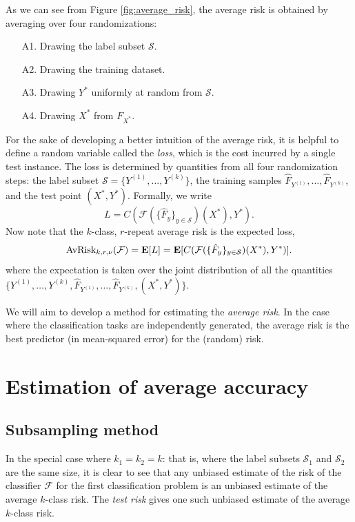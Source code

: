 As we can see from Figure \ref{fig:average_risk}, the average risk is obtained by averaging
over four randomizations:
\begin{enumerate}
\item[A1.] Drawing the label subset $\mathcal{S}$.
\item[A2.] Drawing the training dataset.
\item[A3.] Drawing $Y^*$ uniformly at random from $\mathcal{S}$.
\item[A4.] Drawing $X^*$ from $F_{X^*}$.
\end{enumerate}

For the sake of developing a better intuition of the average risk, it
is helpful to define a random variable called the \emph{loss}, which
is the cost incurred by a single test instance.  The loss is
determined by quantities from all four randomization steps: the label
subset $\mathcal{S} = \{Y^{(1)},\hdots, Y^{(k)}\}$, the training samples
$\hat{F}_{Y^{(1)}},\hdots, \hat{F}_{Y^{(k)}}$, and the test point $(X^*, Y^*)$.
Formally, we write
\[
L = C(\mathcal{F}(\{\hat{F}_y\}_{y \in \mathcal{S}})(X^*), Y^*).
\]
Now note that the $k$-class, $r$-repeat average risk is the expected loss,
\begin{equation}\label{eq:avrisk_EL}
\text{AvRisk}_{k, r, \nu}(\mathcal{F}) = \textbf{E}[L] = \textbf{E}[C(\mathcal{F}(\{\hat{F}_y\}_{y \in \mathcal{S}})(X^*), Y^*)].
\end{equation}
where the expectation is taken over the joint distribution of all the
quantities $\{Y^{(1)},\hdots,
Y^{(k)}, \hat{F}_{Y^{(1)}},\hdots, \hat{F}_{Y^{(k)}}, (X^*, Y^*)\}$.

We will aim to develop a method for estimating the \emph{average
risk}.  In the case where the classification tasks are independently
generated, the average risk is the best predictor (in mean-squared
error) for the (random) risk.


\section{Estimation of average accuracy}

\subsection{Subsampling method}

In the special case where $k_1 = k_2 = k$: that is, where the label
subsets $\mathcal{S}_1$ and $\mathcal{S}_2$ are the same size, it is
clear to see that any unbiased estimate of the risk of the classifier
$\mathcal{F}$ for the first classification problem is an unbiased
estimate of the average $k$-class risk.  The \emph{test risk}
gives one such unbiased estimate of the average $k$-class risk.

